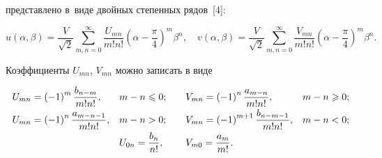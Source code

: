 представлено в~виде двойных степенных рядов~[4]:



\vspace{-2mm}

\begin{equation}

\label{khromov:eq8}

u\left( {\alpha ,\beta } \right) = \frac{V}{\sqrt 2 }\sum\limits_{m,n = 

0}^\infty {\frac{U_{mn} }{m!n!}\left( {\alpha - \frac{\pi }{4}} 

\right)^m\beta ^n} ,\quad v\left( {\alpha ,\beta } \right) = \frac{V}{\sqrt 

2 }\sum\limits_{m,n = 0}^\infty {\frac{V_{mn} }{m!n!}\left( {\alpha - 

\frac{\pi }{4}} \right)^m\beta ^n} .

\end{equation}

\vspace{-3mm}



\noindent

Коэффициенты $U_{mn}$, $V_{mn}$ можно записать в виде 

\[

\begin{array}{llll}

\displaystyle U_{mn} = \left( { - 1} \right)^m\frac{b_{n - m} }{m!n!},& 

\displaystyle m - n 

\leqslant 0;\quad & \displaystyle  V_{mn} = \left( { - 1} \right)^n\frac{a_{m - n} 

}{m!n!}, &\displaystyle   m - n \geqslant 0; \vspace{1mm}\\ 

\displaystyle

 U_{mn} = \left( { - 1} \right)^n\frac{a_{m - n - 1} }{m!n!}, &\displaystyle  m - n > 

0;&\displaystyle  V_{mn} = \left( { - 1} \right)^{m + 1}\frac{b_{n - m - 1} 

}{m!n!}, &\displaystyle  m - n < 0; \vspace{1mm}\\ 

& \displaystyle U_{0n} = \frac{b_n }{n!}, & \displaystyle  V_{m0} = \frac{a_m }{m!}.

 \end{array}

\]

